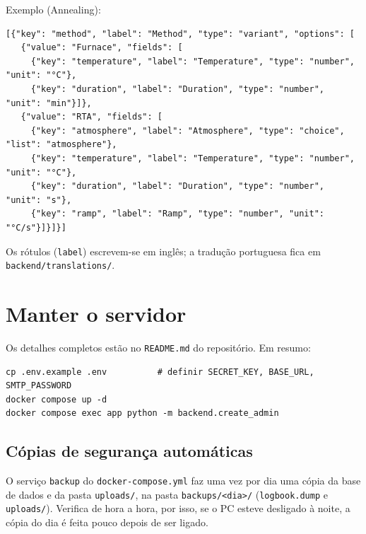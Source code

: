 \documentclass[11pt,a4paper]{article}
\begin{document}
Exemplo (Annealing):

\begin{tcolorbox}[colback=gray!5,colframe=gray!40,boxrule=0.4pt,arc=1pt]
\footnotesize
\begin{verbatim}
[{"key": "method", "label": "Method", "type": "variant", "options": [
   {"value": "Furnace", "fields": [
     {"key": "temperature", "label": "Temperature", "type": "number", "unit": "°C"},
     {"key": "duration", "label": "Duration", "type": "number", "unit": "min"}]},
   {"value": "RTA", "fields": [
     {"key": "atmosphere", "label": "Atmosphere", "type": "choice", "list": "atmosphere"},
     {"key": "temperature", "label": "Temperature", "type": "number", "unit": "°C"},
     {"key": "duration", "label": "Duration", "type": "number", "unit": "s"},
     {"key": "ramp", "label": "Ramp", "type": "number", "unit": "°C/s"}]}]}]
\end{verbatim}
\end{tcolorbox}

Os rótulos (\texttt{label}) escrevem-se em inglês; a tradução portuguesa
fica em \texttt{backend/translations/}.

\section{Manter o servidor}
\label{sec:install}

Os detalhes completos estão no \texttt{README.md} do repositório. Em resumo:

\begin{tcolorbox}[colback=gray!5,colframe=gray!40,boxrule=0.4pt,arc=1pt]
\footnotesize
\begin{verbatim}
cp .env.example .env          # definir SECRET_KEY, BASE_URL, SMTP_PASSWORD
docker compose up -d
docker compose exec app python -m backend.create_admin
\end{verbatim}
\end{tcolorbox}

\subsection{Cópias de segurança automáticas}

O serviço \texttt{backup} do \texttt{docker-compose.yml} faz uma vez por dia
uma cópia da base de dados e da pasta \texttt{uploads/}, na pasta
\nolinkurl{backups/<dia>/} (\texttt{logbook.dump} e \texttt{uploads/}). Verifica
de hora a hora, por isso, se o PC esteve desligado à noite, a cópia do dia é
feita pouco depois de ser ligado.
\end{document}
